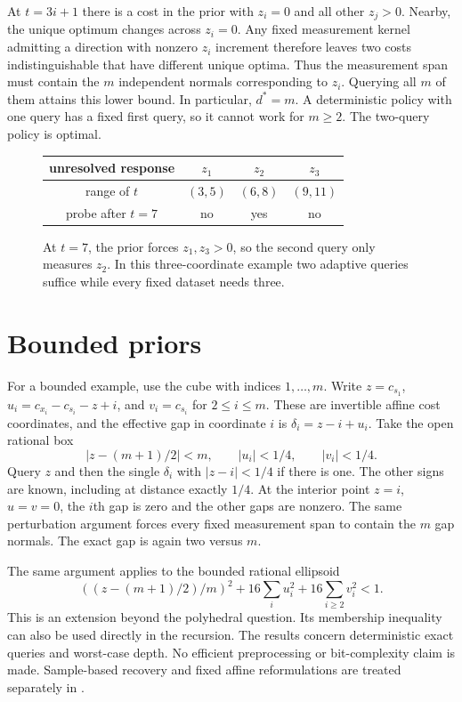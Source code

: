 \documentclass[11pt,a4paper]{amsart}
\begin{document}
At $t=3i+1$ there is a cost in the prior with $z_i=0$ and all other $z_j>0$. Nearby, the unique optimum changes across $z_i=0$. Any fixed measurement kernel admitting a direction with nonzero $z_i$ increment therefore leaves two costs indistinguishable that have different unique optima. Thus the measurement span must contain the $m$ independent normals corresponding to $z_i$. Querying all $m$ of them attains this lower bound. In particular, $d^*=m$. A deterministic policy with one query has a fixed first query, so it cannot work for $m\geq2$. The two-query policy is optimal.

\begin{figure}[t]
\centering
\setlength{\tabcolsep}{9pt}
\begin{tabular}{c|ccc}
unresolved response & $z_1$ & $z_2$ & $z_3$\\ \hline
range of $t$ & $(3,5)$ & $(6,8)$ & $(9,11)$\\
probe after $t=7$ & no & yes & no
\end{tabular}
\caption{At $t=7$, the prior forces $z_1,z_3>0$, so the second query only measures $z_2$. In this three-coordinate example two adaptive queries suffice while every fixed dataset needs three.}
\end{figure}

\section{Bounded priors}
For a bounded example, use the cube with indices $1,\ldots,m$. Write $z=c_{s_1}$, $u_i=c_{x_i}-c_{s_i}-z+i$, and $v_i=c_{s_i}$ for $2\leq i\leq m$. These are invertible affine cost coordinates, and the effective gap in coordinate $i$ is $\delta_i=z-i+u_i$. Take the open rational box
\[
 |z-(m+1)/2|<m,\qquad |u_i|<1/4,\qquad |v_i|<1/4.
\]
Query $z$ and then the single $\delta_i$ with $|z-i|<1/4$ if there is one. The other signs are known, including at distance exactly $1/4$. At the interior point $z=i$, $u=v=0$, the $i$th gap is zero and the other gaps are nonzero. The same perturbation argument forces every fixed measurement span to contain the $m$ gap normals. The exact gap is again two versus $m$.

The same argument applies to the bounded rational ellipsoid
\[
       ((z-(m+1)/2)/m)^2 + 16\sum_i u_i^2+16\sum_{i\geq2}v_i^2 < 1 .
\]
This is an extension beyond the polyhedral question. Its membership inequality can also be used directly in the recursion. The results concern deterministic exact queries and worst-case depth. No efficient preprocessing or bit-complexity claim is made. Sample-based recovery and fixed affine reformulations are treated separately in \cite{compression}.
\end{document}
